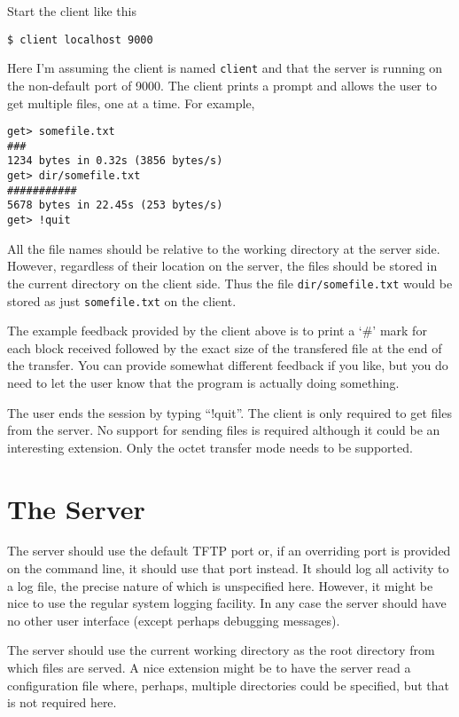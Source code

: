 \documentclass[twocolumn]{article}
\begin{document}
Start the client like this

\begin{verbatim}
$ client localhost 9000
\end{verbatim}

Here I'm assuming the client is named \texttt{client} and that the server is running on the
non-default port of 9000. The client prints a prompt and allows the user to get multiple files,
one at a time. For example,

\begin{verbatim}
get> somefile.txt
###
1234 bytes in 0.32s (3856 bytes/s)
get> dir/somefile.txt
###########
5678 bytes in 22.45s (253 bytes/s)
get> !quit
\end{verbatim}

All the file names should be relative to the working directory at the server side. However,
regardless of their location on the server, the files should be stored in the current directory
on the client side. Thus the file \texttt{dir/somefile.txt} would be stored as just
\texttt{somefile.txt} on the client.

The example feedback provided by the client above is to print a `\#' mark for each block
received followed by the exact size of the transfered file at the end of the transfer. You can
provide somewhat different feedback if you like, but you do need to let the user know that the
program is actually doing something.

The user ends the session by typing ``!quit''. The client is only required to get files from the
server. No support for sending files is required although it could be an interesting extension.
Only the octet transfer mode needs to be supported.

\section{The Server}

The server should use the default TFTP port or, if an overriding port is provided on the command
line, it should use that port instead. It should log all activity to a log file, the precise
nature of which is unspecified here. However, it might be nice to use the regular system logging
facility. In any case the server should have no other user interface (except perhaps debugging
messages).

The server should use the current working directory as the root directory from which files are
served. A nice extension might be to have the server read a configuration file where, perhaps,
multiple directories could be specified, but that is not required here.
\end{document}
